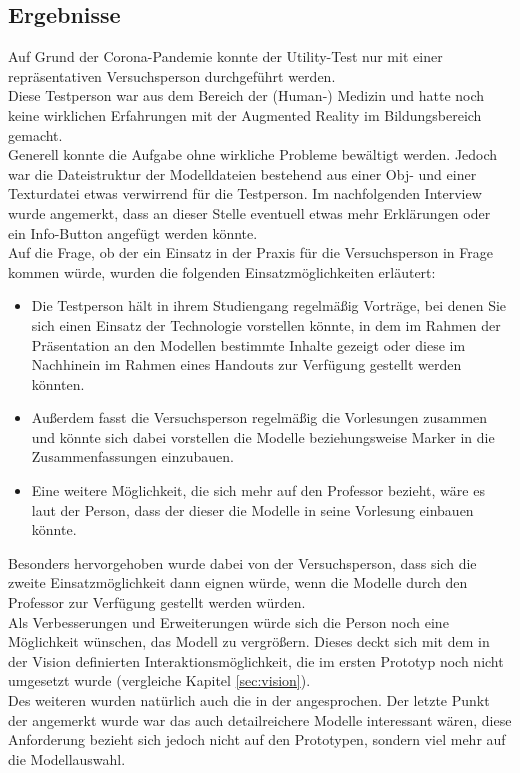\subsection{Ergebnisse}
Auf Grund der Corona-Pandemie konnte der Utility-Test nur mit einer repräsentativen Versuchsperson durchgeführt werden.  \\
Diese Testperson war aus dem Bereich der (Human-) Medizin und hatte noch keine wirklichen Erfahrungen mit der Augmented Reality im Bildungsbereich gemacht.\\
Generell konnte die Aufgabe ohne wirkliche Probleme bewältigt werden. Jedoch war die Dateistruktur der Modelldateien bestehend aus einer Obj- und einer Texturdatei etwas verwirrend für die Testperson. Im nachfolgenden Interview wurde angemerkt, dass an dieser Stelle eventuell etwas mehr Erklärungen oder ein Info-Button angefügt werden könnte.\\
Auf die Frage, ob der ein Einsatz in der Praxis für die Versuchsperson in Frage kommen würde, wurden die folgenden Einsatzmöglichkeiten erläutert:
\begin{itemize}
\item Die Testperson hält in ihrem Studiengang regelmäßig Vorträge, bei denen Sie sich einen Einsatz der Technologie vorstellen könnte, in dem im Rahmen der Präsentation an den Modellen bestimmte Inhalte gezeigt oder diese im Nachhinein im Rahmen eines Handouts zur Verfügung gestellt werden könnten.
\item Außerdem fasst die Versuchsperson regelmäßig die Vorlesungen zusammen und könnte sich dabei vorstellen die Modelle beziehungsweise Marker in die Zusammenfassungen einzubauen.
\item Eine weitere Möglichkeit, die sich mehr auf den Professor bezieht, wäre es laut der Person, dass der dieser die Modelle in seine Vorlesung einbauen könnte.
\end{itemize}
Besonders hervorgehoben wurde dabei von der Versuchsperson, dass sich die zweite Einsatzmöglichkeit dann eignen würde, wenn die Modelle durch den Professor zur Verfügung gestellt werden würden.\\
Als Verbesserungen und Erweiterungen würde sich die Person noch eine Möglichkeit wünschen, das Modell zu vergrößern. Dieses deckt sich mit dem in der Vision definierten Interaktionsmöglichkeit, die im ersten Prototyp noch nicht umgesetzt wurde (vergleiche Kapitel \ref{sec:vision}).  \\
Des weiteren wurden natürlich auch die in der  angesprochen.
Der letzte Punkt der angemerkt wurde war das auch detailreichere Modelle interessant wären, diese Anforderung bezieht sich jedoch nicht auf den Prototypen, sondern viel mehr auf die Modellauswahl.

